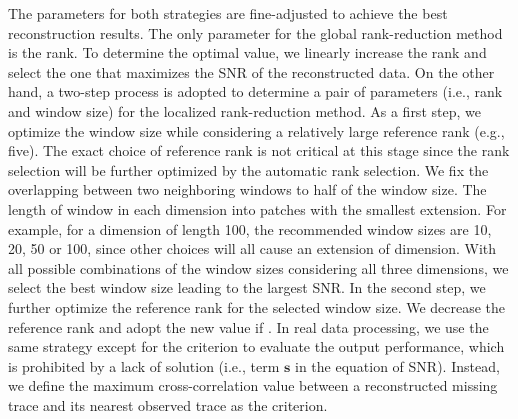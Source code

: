 The parameters for both strategies are fine-adjusted to achieve the best reconstruction results. The only parameter for the global rank-reduction method is the rank. To determine the optimal value, we linearly increase the rank and select the one that maximizes the SNR of the reconstructed data.  On the other hand, a two-step process is adopted to determine a pair of parameters (i.e., rank and window size) for the localized rank-reduction method.  As a first step, we optimize the window size while considering a relatively large reference rank (e.g., five). The exact choice of reference rank is not critical at this stage since the rank selection will be further optimized by the automatic rank selection. We fix the overlapping between two neighboring windows to half of the window size. The length of window in each dimension  into patches with the smallest extension. For example, for a dimension of length 100, the recommended window sizes are 10, 20, 50 or 100, since other choices will all cause an extension of dimension. With all possible combinations of the window sizes considering all three dimensions, we select the best window size leading to the largest SNR. In the second step, we further optimize the reference rank for the selected window size.  We decrease the reference rank and adopt the new value if . In real data processing, we use the same strategy except for the criterion to evaluate the output performance, which is prohibited by a lack of  solution (i.e., term $\mathbf{s}$ in the equation of SNR). Instead, we define the maximum cross-correlation value between a reconstructed missing trace and its nearest observed trace as the criterion. 


